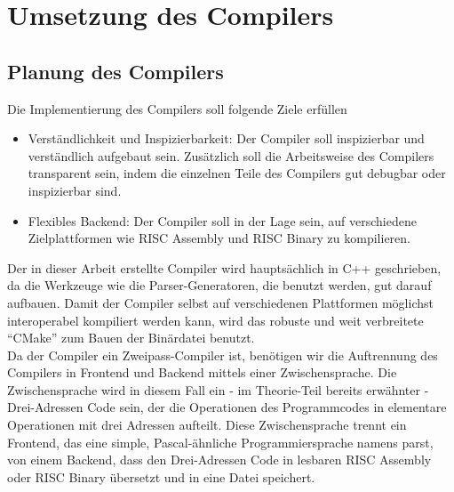 \part{Umsetzung des Compilers}
\chapter{Planung des Compilers}

Die Implementierung des Compilers soll folgende Ziele erfüllen

\begin{itemize}
\item Verständlichkeit und Inspizierbarkeit: Der Compiler soll inspizierbar und verständlich aufgebaut sein. Zusätzlich soll die Arbeitsweise des Compilers transparent sein, indem die einzelnen Teile des Compilers gut debugbar oder inspizierbar sind.
\item Flexibles Backend: Der Compiler soll in der Lage sein, auf verschiedene Zielplattformen wie RISC Assembly und RISC Binary zu kompilieren.
\end{itemize}

Der in dieser Arbeit erstellte Compiler  wird hauptsächlich in C++ geschrieben, da die Werkzeuge wie die Parser-Generatoren, die benutzt werden, gut darauf aufbauen.
Damit der Compiler selbst auf verschiedenen Plattformen möglichst interoperabel kompiliert werden kann, wird das robuste und weit verbreitete ``CMake'' zum Bauen der Binärdatei benutzt.\\
Da der Compiler ein Zweipass-Compiler ist, benötigen wir die Auftrennung des Compilers in Frontend und Backend mittels einer Zwischensprache.
Die Zwischensprache wird in diesem Fall ein - im Theorie-Teil bereits erwähnter - Drei-Adressen Code sein, der die Operationen des Programmcodes in elementare Operationen mit drei Adressen aufteilt.
Diese Zwischensprache trennt ein Frontend, das eine simple, Pascal-ähnliche Programmiersprache namens  parst, von einem Backend, dass den Drei-Adressen Code in lesbaren RISC Assembly oder RISC Binary übersetzt und in eine Datei speichert.\\

